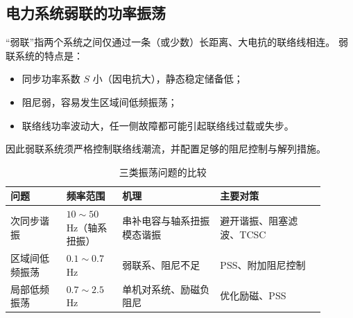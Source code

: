 \subsection{电力系统弱联的功率振荡}

“弱联”指两个系统之间仅通过一条（或少数）长距离、大电抗的联络线相连。
弱联系统的特点是：
\begin{itemize}
  \item 同步功率系数 $S$ 小（因电抗大），静态稳定储备低；
  \item 阻尼弱，容易发生区域间低频振荡；
  \item 联络线功率波动大，任一侧故障都可能引起联络线过载或失步。
\end{itemize}
因此弱联系统须严格控制联络线潮流，并配置足够的阻尼控制与解列措施。

\begin{table}[htbp]
  \centering
  \caption{三类振荡问题的比较}
  \small
  \begin{tabular}{@{}p{0.16\linewidth}p{0.16\linewidth}p{0.28\linewidth}p{0.30\linewidth}@{}}
    \toprule
    问题 & 频率范围 & 机理 & 主要对策 \\
    \midrule
    次同步谐振 & $10\sim50$ Hz（轴系扭振） & 串补电容与轴系扭振模态谐振 & 避开谐振、阻塞滤波、TCSC \\
    区域间低频振荡 & $0.1\sim0.7$ Hz & 弱联系、阻尼不足 & PSS、附加阻尼控制 \\
    局部低频振荡 & $0.7\sim2.5$ Hz & 单机对系统、励磁负阻尼 & 优化励磁、PSS \\
    \bottomrule
  \end{tabular}
\end{table}

